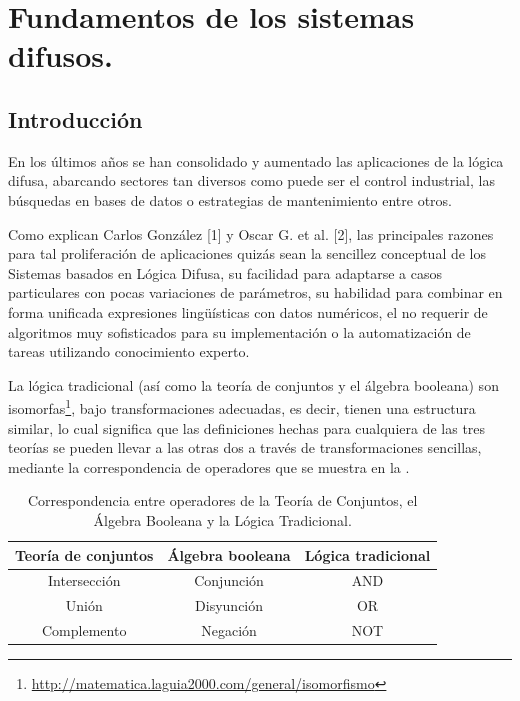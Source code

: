 \section{Fundamentos de los sistemas difusos.}

\subsection{Introducción}
En los últimos años se han consolidado y aumentado las aplicaciones de la lógica difusa, abarcando sectores tan diversos como puede ser el control industrial, las búsquedas en bases de datos o estrategias de mantenimiento entre otros.

Como explican Carlos González [1] y Oscar G. et al. [2], las principales razones para tal proliferación de aplicaciones quizás sean la
sencillez conceptual de los Sistemas basados en Lógica Difusa, su facilidad
para adaptarse a casos particulares con pocas variaciones de parámetros,
su habilidad para combinar en forma unificada expresiones lingüísticas con
datos numéricos, el no requerir de algoritmos muy sofisticados para su
implementación o la automatización de tareas utilizando conocimiento experto.

La lógica tradicional (así como la teoría de conjuntos y el álgebra booleana) son isomorfas\footnote{\url{http://matematica.laguia2000.com/general/isomorfismo}}, bajo transformaciones adecuadas, es decir, tienen una estructura similar, lo cual significa que las definiciones hechas para cualquiera de las tres teorías se pueden llevar a las otras dos a través de transformaciones sencillas, mediante la correspondencia de operadores que se muestra en la .



\begin{table}[h]
	\centering
	\begin{tabular}{@{}ccc@{}}
		\toprule
		\multicolumn{1}{l}{\textbf{Teoría de conjuntos}} & \multicolumn{1}{l}{\textbf{Álgebra booleana}} & \multicolumn{1}{l}{\textbf{Lógica tradicional}} \\ \midrule
		\multicolumn{1}{c}{Intersección}               & \multicolumn{1}{c}{Conjunción}               & \multicolumn{1}{c}{AND}                        \\ \midrule
		\multicolumn{1}{c}{Unión}                      & \multicolumn{1}{c}{Disyunción}               & \multicolumn{1}{c}{OR}                         \\ \midrule
		Complemento                                      & Negación                                      & NOT                                             \\ \bottomrule
	\end{tabular}
	\caption{Correspondencia entre operadores de la Teoría de Conjuntos, el Álgebra Booleana y la Lógica Tradicional.}
	\label{table:1}
\end{table}

